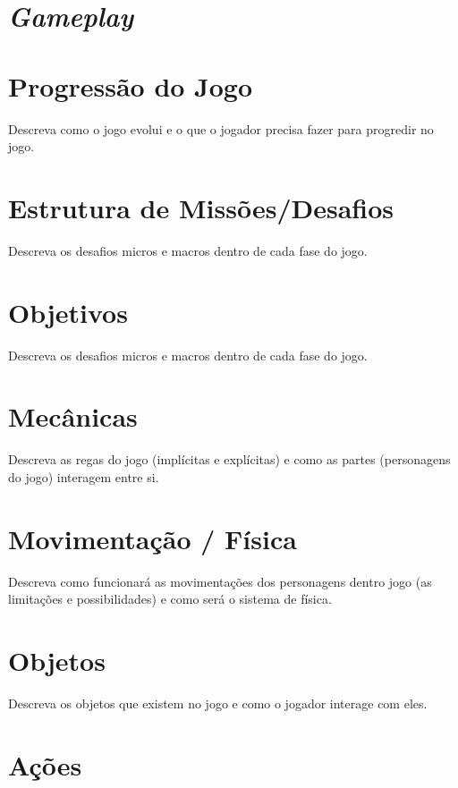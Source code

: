 \section{\textit{Gameplay}}

\section{Progressão do Jogo}

Descreva como o jogo evolui e o que o jogador precisa fazer para progredir no jogo.

\section{Estrutura de Missões/Desafios}

Descreva os desafios micros e macros dentro de cada fase do jogo.

\section{Objetivos}

Descreva os desafios micros e macros dentro de cada fase do jogo.

\section{Mecânicas}

Descreva as regas do jogo (implícitas e explícitas) e como as partes (personagens do jogo) interagem entre si.

\section{Movimentação / Física}

Descreva como funcionará as movimentações dos personagens dentro jogo (as limitações e possibilidades) e como será o sistema de física.

\section{Objetos}

Descreva os objetos que existem no jogo e como o jogador interage com eles.

\section{Ações}

